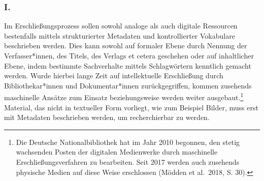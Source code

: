 \documentclass[a4paper,
fontsize=11pt,
oneside,
numbers=noperiodatend,
parskip=half-,
bibliography=totoc,
final
]{scrartcl}
\begin{document}
\hypertarget{i.}{%
\subsubsection{I.}\label{i.}}

Im Erschließungsprozess sollen sowohl analoge als auch digitale
Ressourcen bestenfalls mittels strukturierter Metadaten und
kontrollierter Vokabulare beschrieben werden. Dies kann sowohl auf
formaler Ebene durch Nennung der Verfasser*innen, des Titels, des
Verlags et cetera geschehen oder auf inhaltlicher Ebene, indem bestimmte
Sachverhalte mittels Schlagwörtern kenntlich gemacht werden. Wurde
hierbei lange Zeit auf intellektuelle Erschließung durch
Bibliothekar*innen und Dokumentar*innen zurückgegriffen, kommen
zusehends maschinelle Ansätze zum Einsatz beziehungsweise werden weiter
ausgebaut.\footnote{Die Deutsche Nationalbibliothek hat im Jahr 2010
  begonnen, den stetig wachsenden Posten der digitalen Medienwerke durch
  maschinelle Erschließungsverfahren zu bearbeiten. Seit 2017 werden
  auch zusehends physische Medien auf diese Weise erschlossen (Mödden et
  al.~2018, S. 30).} Material, das nicht in textueller Form vorliegt,
wie zum Beispiel Bilder, muss erst mit Metadaten beschrieben werden, um
recherchierbar zu werden.
\end{document}
